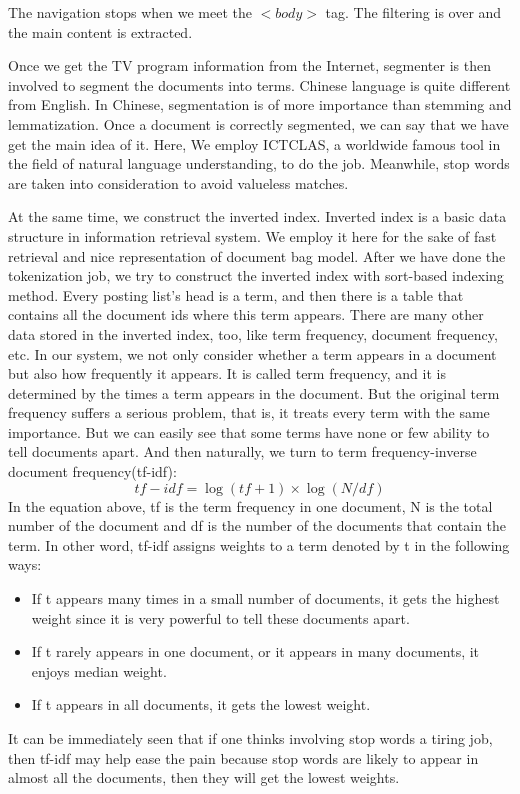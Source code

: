 The navigation stops when we meet the $<body>$ tag. The filtering is over and the main content is extracted.

Once we get the TV program information from the Internet, segmenter is then involved to segment the documents into terms. Chinese language is quite different from English. In Chinese, segmentation is of more importance than stemming and lemmatization. Once a document is correctly segmented, we can say that we have get the main idea of it. Here, We employ ICTCLAS, a worldwide famous tool in the field of natural language understanding, to do the job. Meanwhile, stop words are taken into consideration to avoid valueless matches.

At the same time, we construct the inverted index.
Inverted index is a basic data structure in information retrieval system.
We employ it here for the sake of fast retrieval and nice representation of document bag model. After we have done the tokenization job, we try to construct the inverted index with sort-based indexing method. Every posting list's head is a term, and then there is a table that contains all the document ids where this term appears. There are many other data stored in the inverted index, too, like term frequency, document frequency, etc.
In our system, we not only consider whether a term appears in a document but also how frequently it appears. It is called term frequency, and it is determined by the times a term appears in the document. But the original term frequency suffers a serious problem, that is, it treats every term with the same importance. But we can easily see that some terms have none or few ability to tell documents apart. And then naturally, we turn to term frequency-inverse document frequency(tf-idf):
\begin{equation}
tf-idf=\log(tf+1)\times\log(N/df)
\end{equation}
In the equation above, tf is the term frequency in one document, N is the total number of the document and df is the number of the documents that contain the term. In other word, tf-idf assigns weights to a term denoted by t in the following ways:
\begin{itemize}
\item If t appears many times in a small number of documents, it gets the highest weight since it is very powerful to tell these documents apart.
\item If t rarely appears in one document, or it appears in many documents, it enjoys median weight.
\item If t appears in all documents, it gets the lowest weight.
\end{itemize}
It can be immediately seen that if one thinks involving stop words a tiring job, then tf-idf may help ease the pain because stop words are likely to appear in almost all the documents, then they will get the lowest weights.


